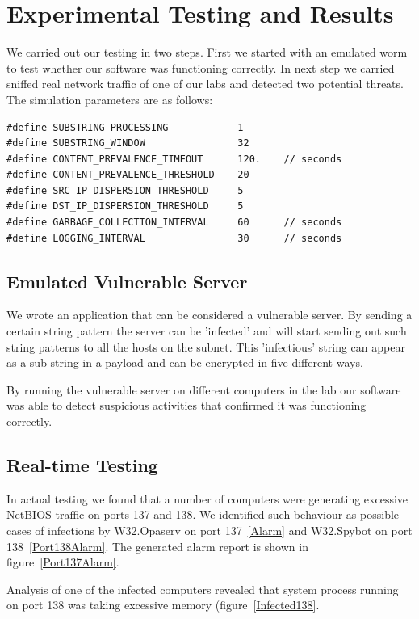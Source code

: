 \documentclass{report}
\begin{document}
\chapter{Experimental Testing and Results}

We carried out our testing in two steps. First we started with an emulated worm to test whether our software was functioning correctly. In next step we carried sniffed real network traffic of one of our labs and detected two potential threats. The simulation parameters are as follows:
\begin{verbatim}
#define SUBSTRING_PROCESSING			1
#define SUBSTRING_WINDOW				32
#define CONTENT_PREVALENCE_TIMEOUT		120.	// seconds
#define CONTENT_PREVALENCE_THRESHOLD	20
#define SRC_IP_DISPERSION_THRESHOLD		5
#define DST_IP_DISPERSION_THRESHOLD		5
#define GARBAGE_COLLECTION_INTERVAL		60		// seconds
#define LOGGING_INTERVAL				30		// seconds
\end{verbatim}

\section{Emulated Vulnerable Server}
We wrote an application that can be considered a vulnerable server. By sending a certain string pattern the server can be 'infected' and will start sending out such string patterns to all the hosts on the subnet. This 'infectious' string can appear as a sub-string in a payload and can be encrypted in five different ways.

By running the vulnerable server on different computers in the lab our software was able to detect suspicious activities that confirmed it was functioning correctly.

\section{Real-time Testing}
In actual testing we found that a number of computers were generating excessive NetBIOS traffic on ports 137 and 138. We identified such behaviour as possible cases of infections by W32.Opaserv on port 137~\ref{Alarm} and W32.Spybot on port 138~\ref{Port138Alarm}. The generated alarm report is shown in figure~\ref{Port137Alarm}.

Analysis of one of the infected computers revealed that system process running on port 138 was taking excessive memory (figure~\ref{Infected138}.
\end{document}
